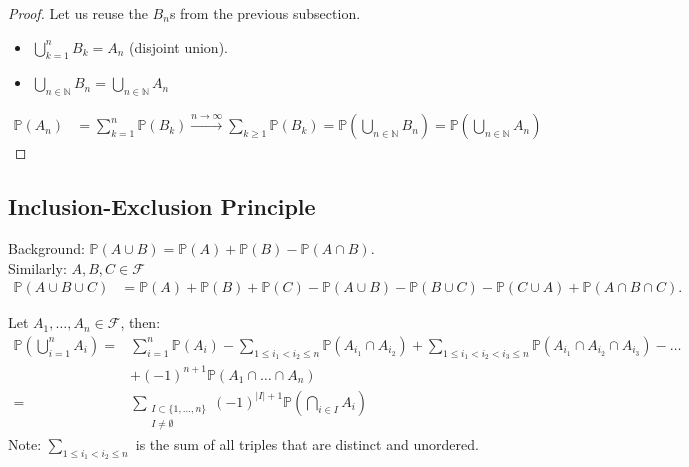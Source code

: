 \begin{proof}
    Let us reuse the $B_n$s from the previous subsection.
    \begin{itemize}
        \item $\bigcup_{k = 1}^n B_k = A_n$ (disjoint union).
        \item $\bigcup_{n \in \mathbb{N}} B_n = \bigcup_{n \in \mathbb{N}} A_n$
    \end{itemize} 
    \begin{align*}
        \mathbb{P}(A_n) &= \sum_{k=1}^{n} \mathbb{P}(B_k) \overset{n \to \infty}{\to} \sum_{k \geq 1} \mathbb{P}(B_k) = \mathbb{P} \left(\bigcup_{n \in \mathbb{N}} B_n \right) = \mathbb{P} \left(\bigcup_{n \in \mathbb{N}} A_n \right) 
    \end{align*} 
\end{proof} 

\subsection{Inclusion-Exclusion Principle}

Background: $\mathbb{P}(A \cup B) = \mathbb{P}(A) + \mathbb{P}(B) - \mathbb{P}(A \cap B)$. \\
Similarly: $A, B, C \in \mathcal{F}$
\begin{align*}
    \mathbb{P}(A \cup B \cup C) &= \mathbb{P}(A) + \mathbb{P}(B) + \mathbb{P}(C) - \mathbb{P}(A \cup B) - \mathbb{P}(B \cup C) - \mathbb{P}(C \cup A) + \mathbb{P}(A \cap B \cap C).
\end{align*} 

\begin{proposition} \label{prp:IEP}
    Let $A_1, \dots, A_n \in \mathcal{F}$, then:
    \begin{align*}
        \mathbb{P} \left(\bigcup_{i = 1}^n A_i \right) = &\sum_{i=1}^{n} \mathbb{P}(A_i) - \sum_{1 \leq i_1 < i_2 \leq n} \mathbb{P}(A_{i_1} \cap A_{i_2}) + \sum_{1 \leq i_1 < i_2 < i_3 \leq n} \mathbb{P}(A_{i_1} \cap A_{i_2} \cap A_{i_3}) - \dots \\ &+ (-1)^{n + 1} \mathbb{P}(A_1 \cap \dots \cap A_n) \\
        = &\sum_{\substack{I \subset \{1, \dots, n\} \\ I \neq \emptyset} } (-1)^{|I| + 1} \mathbb{P} \left( \bigcap_{i \in I} A_i \right)
    \end{align*}
    Note: $\sum_{1 \leq i_1 < i_2 \leq n}$ is the sum of all triples that are distinct and unordered.
\end{proposition}


